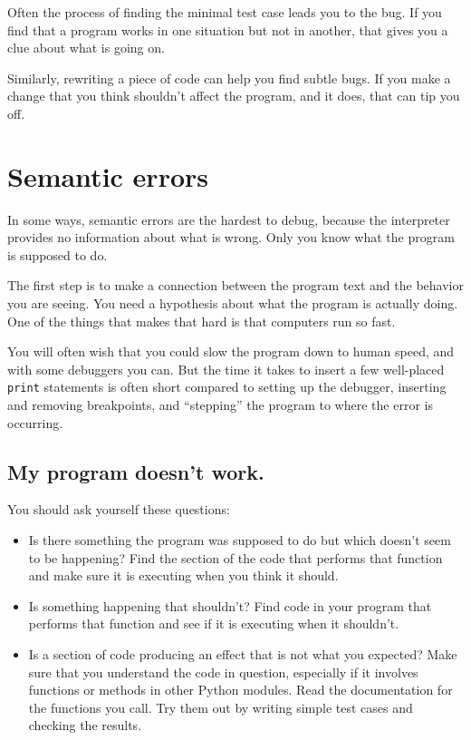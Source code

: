 \documentclass[10pt]{book}
\begin{document}
Often the process of finding the minimal test case leads you to the
bug.  If you find that a program works in one situation but not in
another, that gives you a clue about what is going on.

Similarly, rewriting a piece of code can help you find subtle
bugs.  If you make a change that you think shouldn't affect the
program, and it does, that can tip you off.


\section{Semantic errors}

In some ways, semantic errors are the hardest to debug,
because the interpreter provides no information
about what is wrong.  Only you know what the program is supposed to
do.

The first step is to make a connection between the program
text and the behavior you are seeing.  You need a hypothesis
about what the program is actually doing.  One of the things
that makes that hard is that computers run so fast.

You will often wish that you could slow the program down to human
speed, and with some debuggers you can.  But the time it takes to
insert a few well-placed {\tt print} statements is often short compared to
setting up the debugger, inserting and removing breakpoints, and
``stepping'' the program to where the error is occurring.


\subsection{My program doesn't work.}

You should ask yourself these questions:

\begin{itemize}

\item Is there something the program was supposed to do but
which doesn't seem to be happening?  Find the section of the code
that performs that function and make sure it is executing when
you think it should.

\item Is something happening that shouldn't?  Find code in
your program that performs that function and see if it is
executing when it shouldn't.

\item Is a section of code producing an effect that is not
what you expected?  Make sure that you understand the code in
question, especially if it involves functions or methods in
other Python modules.  Read the documentation for the functions you call.
Try them out by writing simple test cases and checking the results.

\end{itemize}
\end{document}
